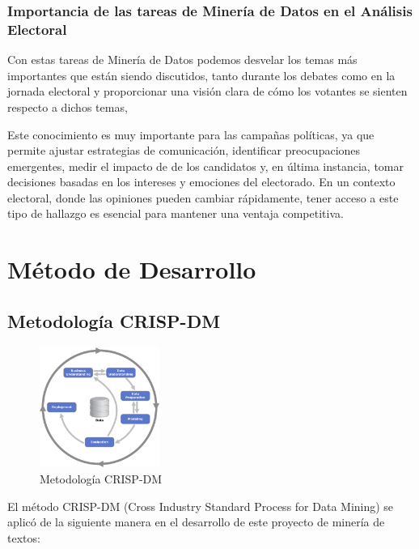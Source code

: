 \documentclass[10pt, a4paper]{article}
\begin{document}
	
	\subsubsection{Importancia de las tareas de Minería de Datos en el Análisis Electoral}
	Con estas tareas de Minería de Datos podemos desvelar los temas más importantes que están siendo discutidos, tanto durante los debates como en la jornada electoral y proporcionar una visión clara de cómo los votantes se sienten respecto a dichos temas,  
	
	Este conocimiento es muy importante para las campañas políticas, ya que permite ajustar estrategias de comunicación, identificar preocupaciones emergentes, medir el impacto de de los candidatos y, en última instancia, tomar decisiones basadas en los intereses y emociones del electorado. En un contexto electoral, donde las opiniones pueden cambiar rápidamente, tener acceso a este tipo de hallazgo es esencial para mantener una ventaja competitiva.
	

	\section{Método de Desarrollo}
	
	\subsection{Metodología CRISP-DM}
	
	
	\begin{figure}[h!] %
		\centering
		\includegraphics[width=0.35\textwidth]{crispdm.png} %
		\caption{Metodología CRISP-DM} %
		\label{fig:crispdm} %
	\end{figure}
	
	
	El método CRISP-DM (Cross Industry Standard Process for Data Mining) se aplicó de la siguiente manera en el desarrollo de este proyecto de minería de textos:
	
\end{document}

